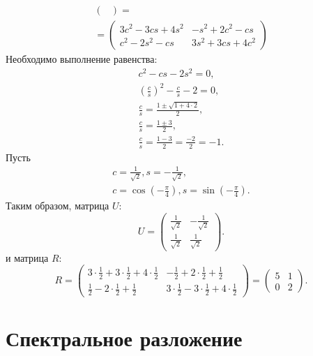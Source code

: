 \begin{example}
\begin{multline*}
\begin{pmatrix}
        \end{pmatrix}
        = \\
        = \begin{pmatrix}
              3 c^2 - 3 c s + 4 s^2 & - s^2 + 2 c^2 - c s   \\
              c^2 - 2 s^2 - c s     & 3 s^2 + 3 c s + 4 c^2
        \end{pmatrix}
    \end{multline*}
    Необходимо выполнение равенства:
    \begin{gather*}
        c^2 - c s - 2 s^2 = 0 , \\
        \left ( \frac{c}{s} \right )^2 - \frac{c}{s} - 2 = 0 , \\
        \frac{c}{s} = \frac{1 \pm \sqrt{1 + 4 \cdot 2}}{2} , \\
        \frac{c}{s} = \frac{1 \pm 3}{2} , \\
        \frac{c}{s} = \frac{1 - 3}{2} = \frac{-2}{2} = -1 .
    \end{gather*}
    Пусть
    \begin{gather*}
        c = \frac{1}{\sqrt{2}}, s = - \frac{1}{\sqrt{2}} , \\
        c = \cos \left ( - \frac{\pi}{4} \right ), s = \sin \left ( - \frac{\pi}{4} \right ) .
    \end{gather*}
    Таким образом, матрица $U$:
    \[
        U
        = \begin{pmatrix}
              \frac{1}{\sqrt{2}} & - \frac{1}{\sqrt{2}} \\
              \frac{1}{\sqrt{2}} & \frac{1}{\sqrt{2}}
        \end{pmatrix}.
    \]
    и матрица $R$:
    \[
        R
        = \begin{pmatrix}
              3 \cdot \frac{1}{2} + 3 \cdot \frac{1}{2} + 4 \cdot \frac{1}{2} & - \frac{1}{2} + 2 \cdot \frac{1}{2} + \frac{1}{2}               \\
              \frac{1}{2} - 2 \cdot \frac{1}{2} + \frac{1}{2}                 & 3 \cdot \frac{1}{2} - 3 \cdot \frac{1}{2} + 4 \cdot \frac{1}{2}
        \end{pmatrix}
        = \begin{pmatrix}
              5 & 1 \\
              0 & 2
        \end{pmatrix} .
    \]
\end{example}


\section{Спектральное разложение}

